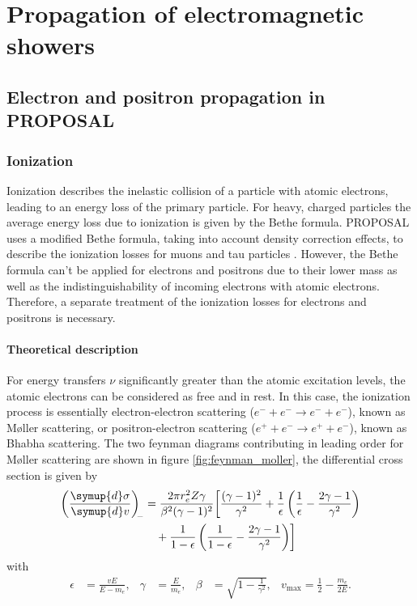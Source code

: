 \chapter{Propagation of electromagnetic showers}

\section{Electron and positron propagation in PROPOSAL}

\label{sec:electronprop}

\subsection{Ionization}

Ionization describes the inelastic collision of a particle with atomic electrons, leading to an energy loss of the primary particle.
For heavy, charged particles the average energy loss due to ionization is given by the Bethe formula.
PROPOSAL uses a modified Bethe formula, taking into account density correction effects, to describe the ionization losses for muons and tau particles \cite{Kohne:2013zbq}.
However, the Bethe formula can't be applied for electrons and positrons due to their lower mass as well as the indistinguishability of incoming electrons with atomic electrons.
Therefore, a separate treatment of the ionization losses for electrons and positrons is necessary.

\subsubsection{Theoretical description}

For energy transfers $\nu$ significantly greater than the atomic excitation levels, the atomic electrons can be considered as free and in rest.
In this case, the ionization process is essentially electron-electron scattering ($e^- + e^- \rightarrow e^- + e^-$), known as M{\o}ller scattering, or positron-electron scattering ($e^+ + e^- \rightarrow e^+ + e^-$), known as Bhabha scattering.
The two feynman diagrams contributing in leading order for M{\o}ller scattering are shown in figure \ref{fig:feynman_moller}, the differential cross section \cite{PhysRev.93.38} is given by
%
\begin{equation}
	\begin{split}
	\label{eqn:moller}
	\left(\frac{\symup{d}\sigma}{\symup{d}v}\right)_{\!\!-} &= \frac{2 \pi r_e^2 Z \gamma}{\beta^2(\gamma - 1)^2} \biggl[ \frac{(\gamma - 1)^2}{\gamma^2} + \frac{1}{\epsilon} \left( \frac{1}{\epsilon} - \frac{2\gamma - 1}{\gamma^2} \right) \\ &\quad+ \frac{1}{1 - \epsilon} \left( \frac{1}{1 - \epsilon} - \frac{2 \gamma - 1}{\gamma^2} \right) \biggr]
	\end{split}
\end{equation}
%
with
%
\begin{align}
	\epsilon &= \frac{v E}{E - m_e},& \gamma &= \frac{E}{m_e}, & \beta &= \sqrt{1 - \frac{1}{\gamma^2}}, & v_{\text{max}} = \frac{1}{2} - \frac{m_e}{2 E}.
\end{align}

